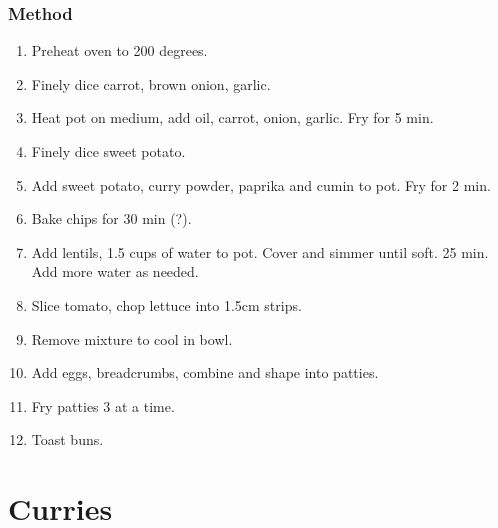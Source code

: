 \documentclass[]{article}
\begin{document}
\subsubsection*{\Large Method}
\begin{enumerate}[font=\huge\color{accent}]
	\item Preheat oven to 200 degrees.
	\item Finely dice carrot, brown onion, garlic.
	\item Heat pot on medium, add oil, carrot, onion, garlic. Fry for 5 min.
	\item Finely dice sweet potato.
	\item Add sweet potato, curry powder, paprika and cumin to pot. Fry for 2 min.
	\item Bake chips for 30 min (?).
	\item Add lentils, 1.5 cups of water to pot. Cover and simmer until soft. 25 min. Add more water as needed.
	\item Slice tomato, chop lettuce into 1.5cm strips.
	\item Remove mixture to cool in bowl.
	\item Add eggs, breadcrumbs, combine and shape into patties.
	\item Fry patties 3 at a time.
	\item Toast buns.
\end{enumerate}
\newpage
{}
\section*{\center\Huge\color{accent}Curries}
\label{cat:Curries}
\label{rec:Chickpea Curry}
\end{document}
